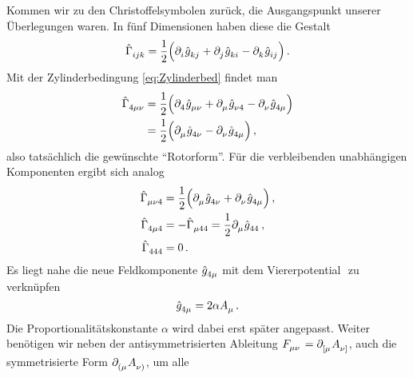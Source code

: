 Kommen wir zu den Christoffelsymbolen zurück, die 
Ausgangspunkt unserer Überlegungen waren. In fünf Dimensionen haben diese die
Gestalt
\begin{equation}
\tensor*{\hat{\Gamma}}{_i_j_k}=\frac{1}{2}
\left(\tensor{\partial}{_i}
\tensor{\hat{g}}{_k_j}+\tensor{\partial}{_j} \tensor{\hat{g}}{_k_i} -
\tensor{\partial}{_k} \tensor{\hat{g}}{_i_j}\right)\, .
\end{equation}
Mit der Zylinderbedingung \eqref{eq:Zylinderbed} findet man 
\begin{equation}
\begin{split}
\tensor*{\hat{\Gamma}}{_4_\mu_\nu}&=\frac{1}{2}
	\left(\tensor{\partial}{_4}\tensor{\hat{g}}{_\mu_\nu} 
+ 	\tensor{\partial}{_\mu}\tensor{\hat{g}}{_\nu_4} 
- 	\tensor{\partial}{_\nu}\tensor{\hat{g}}{_4_\mu}\right)\\
&=\frac{1}{2}
\left(\tensor{\partial}{_\mu}
\tensor{\hat{g}}{_4_\nu} - \tensor{\partial}{_\nu}
\tensor{\hat{g}}{_4_\mu}\right)\,,
\end{split}
\end{equation}
also tatsächlich die gewünschte \enquote{Rotorform}. 
Für die verbleibenden unabhängigen Komponenten ergibt sich analog
\begin{align}
\tensor*{\hat{\Gamma}}{_\mu_\nu_4}&=\frac{1}{2}
\left(\tensor{\partial}{_\mu}
\tensor{\hat{g}}{_4_\nu}+\tensor{\partial}{_\nu}
\tensor{\hat{g}}{_4_\mu}\right)\,,\\
\tensor*{\hat{\Gamma}}{_4_\mu_4}&=-\tensor*{\hat{\Gamma}}{_\mu_4_4}=\frac{1}{2}\tensor{\partial}{_\mu}
\tensor{\hat{g}}{_4_4}\,,\\
\tensor*{\hat{\Gamma}}{_4_4_4}&= 0\,.
\end{align}
Es liegt nahe die neue
Feldkomponente
$\tensor{\hat{g}}{_4_\mu}$ mit
dem Viererpotential $ $ zu verknüpfen
\begin{equation}
\tensor{\hat{g}}{_4_\mu}=2\alpha\tensor{A}{_\mu}\,.
\end{equation}
Die Proportionalitätskonstante $\alpha$ wird dabei erst später angepasst.
 Weiter benötigen wir neben der antisymmetrisierten
Ableitung $\tensor{F}{_\mu_\nu}=\tensor{\partial}{_{[\mu}}\tensor{A}{_{\nu]}}$, auch die
symmetrisierte Form $\tensor{\partial}{_{(\mu}}\tensor{A}{_{\nu)}}$, um alle
